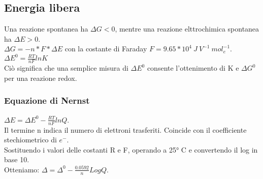 \subsection{Energia libera}
Una reazione spontanea ha $\Delta G < 0$, mentre una reazione elttrochimica spontanea ha $\Delta E > 0$.\\
$\Delta G = -n * F * \Delta E$ con la costante di Faraday $F = 9.65 * 10^4\ J\ V^{-1}\ mol_e^{-1}$.\\
$\Delta E^0 = \frac{RT}{nF}lnK$\\
Ciò significa che una semplice misura di $\Delta E^0$ consente l'ottenimento di K e $\Delta G^0$ per una reazione redox.\\
\subsubsection{Equazione di Nernst}
$\Delta E = \Delta E^0 - \frac{RT}{nF}lnQ$.\\
Il termine n indica il numero di elettroni trasferiti. Coincide con il coefficiente stechiometrico di $e^-$.\\
Sostituendo i valori delle costanti R e F, operando a 25° C e convertendo il log in base 10.\\
Otteniamo: $\Delta = \Delta^0 - \frac{0.0592}{n}LogQ$.

